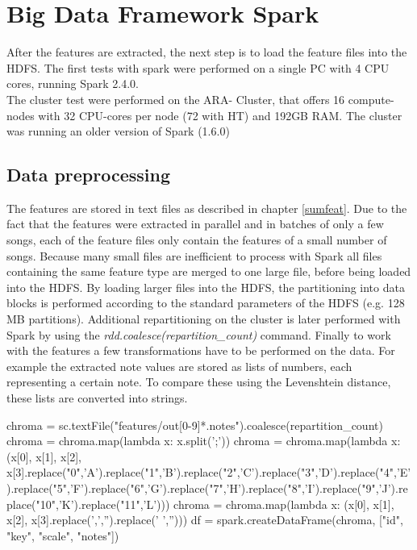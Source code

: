 
\section{Big Data Framework Spark}\label{bds1}

After the features are extracted, the next step is to load the feature files into the HDFS. 
The first tests with spark were performed on a single PC with 4 CPU cores, running Spark 2.4.0.\\ The cluster test were performed on the ARA- Cluster, that offers 16 compute-nodes with 32 CPU-cores per node (72 with HT) and 192GB RAM. The cluster was running an older version of Spark (1.6.0)\\

\subsection{Data preprocessing}

The features are stored in text files as described in chapter \ref{sumfeat}. Due to the fact that the features were extracted in parallel and in batches of only a few songs, each of the feature files only contain the features of a small number of songs. Because many small files are inefficient to process with Spark \cite[p. 153]{sparkbook1} all files containing the same feature type are merged to one large file, before being loaded into the HDFS. By loading larger files into the HDFS, the partitioning into data blocks is performed according to the standard parameters of the HDFS (e.g. 128 MB partitions). Additional repartitioning on the cluster is later performed with Spark by using the \textit{rdd.coalesce(repartition\_count)} command. 
Finally to work with the features a few transformations have to be performed on the data. For example the extracted note values are stored as lists of numbers, each representing a certain note. To compare these using the Levenshtein distance, these lists are converted into strings. 

\begin{pythonCode}[frame=single,label={lst:prep1},caption={notes preprocessing},captionpos=b]
chroma = sc.textFile("features/out[0-9]*.notes").coalesce(repartition_count)
chroma = chroma.map(lambda x: x.split(';'))
chroma = chroma.map(lambda x: (x[0], x[1], x[2], x[3].replace("0",'A').replace("1",'B').replace("2",'C').replace("3",'D').replace("4",'E').replace("5",'F').replace("6",'G').replace("7",'H').replace("8",'I').replace("9",'J').replace("10",'K').replace("11",'L')))
chroma = chroma.map(lambda x: (x[0], x[1], x[2], x[3].replace(',','').replace(' ','')))
df = spark.createDataFrame(chroma, ["id", "key", "scale", "notes"])
\end{pythonCode}

